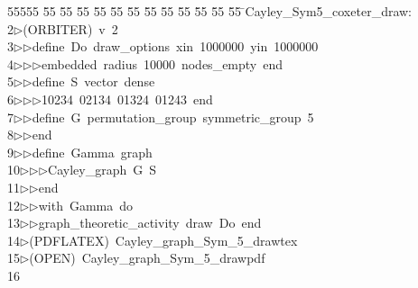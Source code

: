 %
%
\begin{tabbing}
55555 \= 55 \= 55 \= 55 \= 55 \= 55 \= 55 \= 55 \= 55 \= 55 \= 55 \= 55 \= 55 \= \>Cayley\_Sym5\_coxeter\_draw:\\[0pt]
2\>$\triangleright$\>(ORBITER)\ v\ 2\ \\[0pt]
3\>$\triangleright$\>$\triangleright$\>define\ Do\ draw\_options\ xin\ 1000000\ yin\ 1000000\ \\[0pt]
4\>$\triangleright$\>$\triangleright$\>$\triangleright$\>embedded\ radius\ 10000\ nodes\_empty\ end\ \\[0pt]
5\>$\triangleright$\>$\triangleright$\>define\ S\ vector\ dense\ \\[0pt]
6\>$\triangleright$\>$\triangleright$\>$\triangleright$\>10234\ 02134\ 01324\ 01243\ end\ \\[0pt]
7\>$\triangleright$\>$\triangleright$\>define\ G\ permutation\_group\ symmetric\_group\ 5\ \\[0pt]
8\>$\triangleright$\>$\triangleright$\>end\ \\[0pt]
9\>$\triangleright$\>$\triangleright$\>define\ Gamma\ graph\ \\[0pt]
10\>$\triangleright$\>$\triangleright$\>$\triangleright$\>Cayley\_graph\ G\ S\ \\[0pt]
11\>$\triangleright$\>$\triangleright$\>end\ \\[0pt]
12\>$\triangleright$\>$\triangleright$\>with\ Gamma\ do\ \\[0pt]
13\>$\triangleright$\>$\triangleright$\>graph\_theoretic\_activity\ draw\ Do\ end\\[0pt]
14\>$\triangleright$\>(PDFLATEX)\ Cayley\_graph\_Sym\_5\_drawtex\\[0pt]
15\>$\triangleright$\>(OPEN)\ Cayley\_graph\_Sym\_5\_drawpdf\\[0pt]
16\>\end{tabbing}
